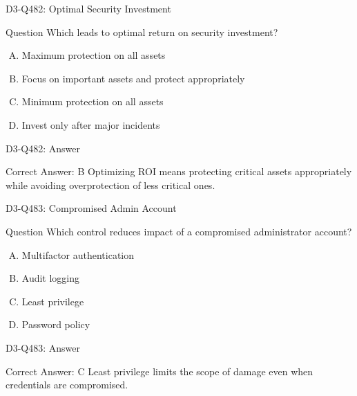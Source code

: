 \documentclass{beamer}
\begin{document}
\begin{frame}{D3-Q482: Optimal Security Investment}
	\begin{block}{Question}
		Which leads to optimal return on security investment?
	\end{block}
	\begin{enumerate}[(A)]
		\item Maximum protection on all assets
		\item Focus on important assets and protect appropriately
		\item Minimum protection on all assets
		\item Invest only after major incidents
	\end{enumerate}
\end{frame}
\begin{frame}{D3-Q482: Answer}
	\begin{block}{Correct Answer: B}
		Optimizing ROI means protecting critical assets appropriately while avoiding overprotection of less critical ones.
	\end{block}
\end{frame}

\begin{frame}{D3-Q483: Compromised Admin Account}
	\begin{block}{Question}
		Which control reduces impact of a compromised administrator account?
	\end{block}
	\begin{enumerate}[(A)]
		\item Multifactor authentication
		\item Audit logging
		\item Least privilege
		\item Password policy
	\end{enumerate}
\end{frame}
\begin{frame}{D3-Q483: Answer}
	\begin{block}{Correct Answer: C}
		Least privilege limits the scope of damage even when credentials are compromised.
	\end{block}
\end{frame}
\end{document}
